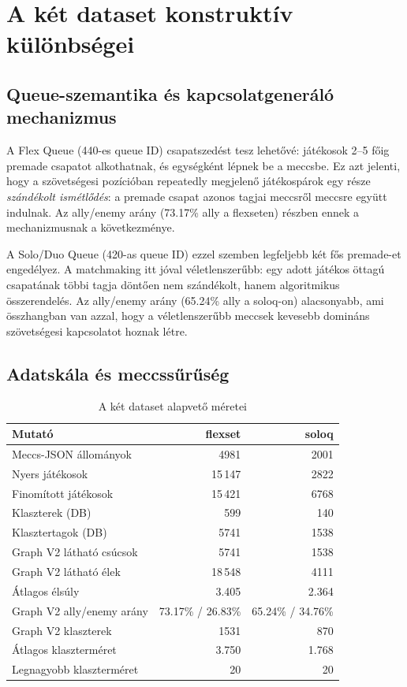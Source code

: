 ﻿\documentclass[a4paper,12pt]{report}
\begin{document}
\section{A két dataset konstruktív különbségei}

\subsection{Queue-szemantika és kapcsolatgeneráló mechanizmus}

A Flex Queue (440-es queue ID) csapatszedést tesz lehetővé: játékosok 2--5 főig premade csapatot alkothatnak, és egységként lépnek be a meccsbe. Ez azt jelenti, hogy a szövetségesi pozícióban repeatedly megjelenő játékospárok egy része \emph{szándékolt ismétlődés}: a premade csapat azonos tagjai meccsről meccsre együtt indulnak. Az ally/enemy arány (73.17\% ally a flexseten) részben ennek a mechanizmusnak a következménye.

A Solo/Duo Queue (420-as queue ID) ezzel szemben legfeljebb két fős premade-et engedélyez. A matchmaking itt jóval véletlenszerűbb: egy adott játékos öttagú csapatának többi tagja döntően nem szándékolt, hanem algoritmikus összerendelés. Az ally/enemy arány (65.24\% ally a soloq-on) alacsonyabb, ami összhangban van azzal, hogy a véletlenszerűbb meccsek kevesebb domináns szövetségesi kapcsolatot hoznak létre.

\subsection{Adatskála és meccssűrűség}

\begin{table}[H]
\centering
\caption{A két dataset alapvető méretei}
\begin{tabularx}{\textwidth}{>{\raggedright\arraybackslash}p{5cm} rr}
\toprule
\textbf{Mutató} & \textbf{flexset} & \textbf{soloq} \\
\midrule
Meccs-JSON állományok & 4981 & 2001 \\
Nyers játékosok & 15\,147 & 2822 \\
Finomított játékosok & 15\,421 & 6768 \\
Klaszterek (DB) & 599 & 140 \\
Klasztertagok (DB) & 5741 & 1538 \\
Graph V2 látható csúcsok & 5741 & 1538 \\
Graph V2 látható élek & 18\,548 & 4111 \\
Átlagos élsúly & 3.405 & 2.364 \\
Graph V2 ally/enemy arány & 73.17\% / 26.83\% & 65.24\% / 34.76\% \\
Graph V2 klaszterek & 1531 & 870 \\
Átlagos klaszterméret & 3.750 & 1.768 \\
Legnagyobb klaszterméret & 20 & 20 \\
\bottomrule
\end{tabularx}
\end{table}
\end{document}
